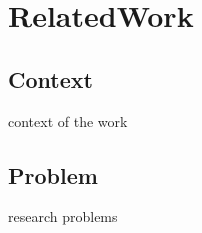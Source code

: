 \chapter{RelatedWork}
\label{chap:RelatedWork}

\section{Context}

context of the work

\section{Problem}
\label{sec:Introduction-Problem}

research problems